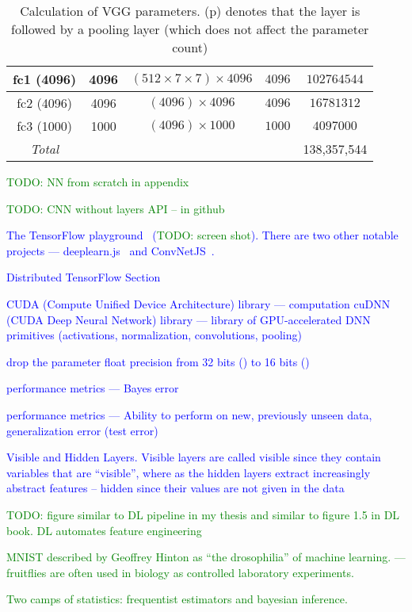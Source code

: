 \begin{table}
\begin{tabular}{|c|c|c|c|c|}
		fc1 (4096)        & 4096 &$(512\times7\times7)\times4096$ & $4096$ & $102764544$    \\ \hline
		fc2 (4096)        & 4096 &$(4096)\times4096$ & $4096$ & $16781312$    \\ \hline
		fc3 (1000)        & 1000 &$(4096)\times1000$ & $1000$ & $4097000$    \\ \hline
		\emph{Total} & & & & 138,357,544 \\ \hline
	\end{tabular}
	\caption{Calculation of VGG parameters. (p) denotes that the layer is followed by a pooling layer (which does not affect the parameter count)}
	\label{tab:vgg_parameter_count}
\end{table}




\textcolor{green}{TODO: NN from scratch in appendix}

\textcolor{green}{TODO: CNN without layers API -- in github}

\textcolor{blue}{The TensorFlow playground~\cite{tf_playground} (\textcolor{green}{TODO: screen shot}).  There are two other notable projects --- deeplearn.js~\cite{deeplearnjs} and ConvNetJS~\cite{convnet_js}.}


\textcolor{blue}{Distributed TensorFlow Section}


\textcolor{blue}{CUDA (Compute Unified Device Architecture) library --- computation}
\textcolor{blue}{cuDNN (CUDA Deep Neural Network) library --- library of GPU-accelerated DNN primitives (activations, normalization, convolutions, pooling)}


\textcolor{blue}{drop the parameter float precision from 32 bits () to 16 bits ()}

\textcolor{blue}{performance metrics --- Bayes error}

\textcolor{blue}{performance metrics --- Ability to perform on new, previously unseen data, generalization error (test error)}

\textcolor{blue}{Visible and Hidden Layers. Visible layers are called visible since they contain variables that are ``visible'', where as the hidden layers extract increasingly abstract features -- hidden since their values are not given in the data}

\textcolor{green}{TODO: figure similar to DL pipeline in my thesis and similar to figure 1.5 in DL book. DL automates feature engineering}


\textcolor{green}{MNIST described by Geoffrey Hinton as ``the drosophilia'' of machine learning. --- fruitflies are often used in biology as controlled laboratory experiments.}


\textcolor{green}{Two camps of statistics: frequentist estimators and bayesian inference.}



